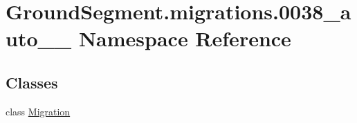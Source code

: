 \hypertarget{namespace_ground_segment_1_1migrations_1_10038__auto__20170131__1731}{}\section{Ground\+Segment.\+migrations.0038\+\_\+auto\+\_\+\_ Namespace Reference}
\label{namespace_ground_segment_1_1migrations_1_10038__auto__20170131__1731}
\subsection*{Classes}
\begin{DoxyCompactItemize}
\item 
class \hyperlink{class_ground_segment_1_1migrations_1_10038__auto__20170131__1731_1_1_migration}{Migration}
\end{DoxyCompactItemize}
